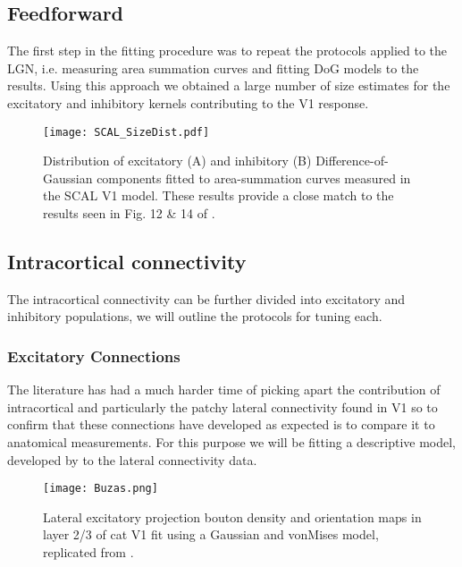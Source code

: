 \subsection{Feedforward}

The first step in the fitting procedure was to repeat the protocols
applied to the LGN, i.e. measuring area summation curves and fitting
DoG models to the results. Using this approach we obtained a large
number of size estimates for the excitatory and inhibitory kernels
contributing to the V1 response.

\begin{figure}
	\centering
        \texttt{[image: SCAL\_SizeDist.pdf]}
	\caption{Distribution of excitatory (A) and inhibitory (B)
          Difference-of-Gaussian components fitted to area-summation
          curves measured in the SCAL V1 model. These results provide
          a close match to the results seen in Fig. 12 \& 14 of
          \cite{Sceniak2001}.}
	\label{SCALSizeDist}
\end{figure}

\subsection{Intracortical connectivity}

The intracortical connectivity can be further divided into excitatory
and inhibitory populations, we will outline the protocols for tuning
each.

\subsubsection{Excitatory Connections}

The literature has had a much harder time of picking apart the
contribution of intracortical and particularly the patchy lateral
connectivity found in V1 so to confirm that these connections have
developed as expected is to compare it to anatomical measurements.
For this purpose we will be fitting a descriptive model, developed by
\cite{Buzas2006} to the lateral connectivity data.

\begin{figure}
	\centering
        \texttt{[image: Buzas.png]}
	\caption{Lateral excitatory projection bouton density and
          orientation maps in layer 2/3 of cat V1 fit using a Gaussian
          and vonMises model, replicated from \cite{Buzas2006}.}
	\label{Buzas}
\end{figure}

